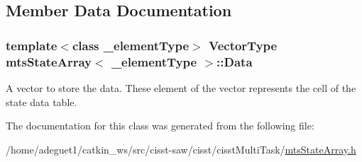 \subsection{Member Data Documentation}
\hypertarget{classmts_state_array_a4ae00b885b6acad1662b1f77451ba791}{
\subsubsection[{Data}]{\setlength{\rightskip}{0pt plus 5cm}template$<$class \-\_\-element\-Type$>$ {\bf Vector\-Type} {\bf mts\-State\-Array}$<$ \-\_\-element\-Type $>$\-::Data\hspace{0.3cm}{\ttfamily [protected]}}}\label{classmts_state_array_a4ae00b885b6acad1662b1f77451ba791}
A vector to store the data. These element of the vector represents the cell of the state data table. 

The documentation for this class was generated from the following file\-:\begin{DoxyCompactItemize}
\item 
/home/adeguet1/catkin\-\_\-ws/src/cisst-\/saw/cisst/cisst\-Multi\-Task/\hyperlink{mts_state_array_8h}{mts\-State\-Array.\-h}\end{DoxyCompactItemize}
